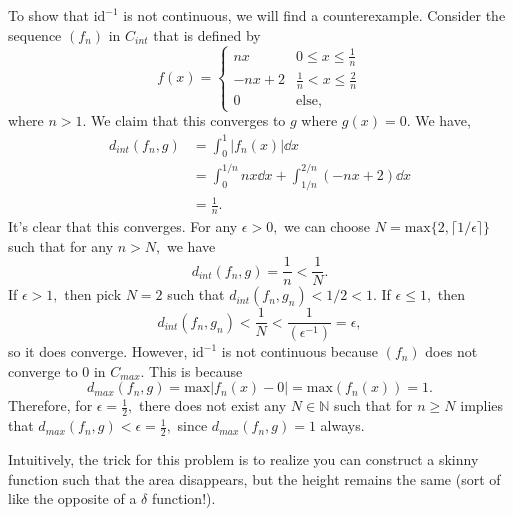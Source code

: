 \documentclass{article}
\numberwithin{equation}{section}
\begin{document}
\begin{enumerate}
    To show that $\text{id}^{-1}$ is not continuous, we will find a counterexample. Consider the sequence $(f_n)$ in $C_{int}$ that is defined by 
    \begin{equation*}
        f(x) = \begin{cases}
            nx & 0 \le x \le \frac{1}{n} \\ 
            -nx + 2 & \frac{1}{n} < x \le \frac{2}{n} \\ 
            0 & \text{else},
        \end{cases}
    \end{equation*}
    where $n>1.$ We claim that this converges to $g$ where $g(x)=0.$ We have,
    \begin{align*}
        d_{int}(f_n,g) &= \int_0^1 |f_n(x)| \dd{x} \\ 
        &= \int_0^{1/n} nx \dd{x} + \int_{1/n}^{2/n} (-nx + 2)\dd{x} \\ 
        &= \frac{1}{n}.
    \end{align*}
It's clear that this converges. For any $\epsilon > 0,$ we can choose $N=\text{max}\{2,\lceil 1/ \epsilon\rceil\}$ such that for any $n > N,$ we have 
    \begin{equation*}
        d_{int}(f_n,g) = \frac{1}{n} < \frac{1}{N}.
    \end{equation*}
    If $\epsilon > 1,$ then pick $N=2$ such that $d_{int}(f_n,g_n) < 1/2 < 1.$ If $\epsilon \le 1,$ then
    \begin{equation*}
        d_{int}(f_n,g_n) < \frac{1}{N} < \frac{1}{(\epsilon^{-1})}  = \epsilon,
    \end{equation*}  
    so it does converge. However, $\text{id}^{-1}$ is not continuous because $(f_n)$ does not converge to $0$ in $C_{max}.$ This is because 
    \begin{equation*}
        d_{max}(f_n,g) = \text{max}|f_n(x)-0| = \text{max}(f_n(x)) = 1. 
    \end{equation*}
    Therefore, for $\epsilon = \frac{1}{2},$ there does not exist any $N \in \mathbb{N}$ such that for $n \ge N$ implies that $d_{max}(f_n,g) < \epsilon = \frac{1}{2},$ since $d_{max}(f_n,g)=1$ always.

    Intuitively, the trick for this problem is to realize you can construct a skinny function such that the area disappears, but the height remains the same (sort of like the opposite of a $\delta$ function!).
\end{enumerate}
\end{document}
